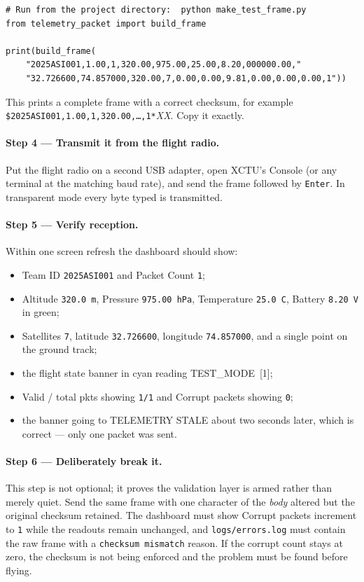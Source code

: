 \documentclass[11pt,a4paper]{article}
\newcommand{\file}[1]{\texttt{#1}}
\newcommand{\code}[1]{\texttt{#1}}
\newcommand{\degC}{\textdegree C}
\begin{document}
\begin{lstlisting}[caption={\file{make\_test\_frame.py} --- generates one valid test frame.}]
# Run from the project directory:  python make_test_frame.py
from telemetry_packet import build_frame

print(build_frame(
    "2025ASI001,1.00,1,320.00,975.00,25.00,8.20,000000.00,"
    "32.726600,74.857000,320.00,7,0.00,0.00,9.81,0.00,0.00,0.00,1"))
\end{lstlisting}

This prints a complete frame with a correct checksum, for example
\code{\$2025ASI001,1.00,1,320.00,\ldots,1*}\textit{XX}. Copy it exactly.

\paragraph{Step 4 --- Transmit it from the flight radio.}
Put the flight radio on a second USB adapter, open XCTU's \textsf{Console}
(or any terminal at the matching baud rate), and send the frame followed by
\code{Enter}. In transparent mode every byte typed is transmitted.

\paragraph{Step 5 --- Verify reception.}
Within one screen refresh the dashboard should show:

\begin{itemize}
  \item Team ID \code{2025ASI001} and Packet Count \code{1};
  \item Altitude \code{320.0\,m}, Pressure \code{975.00\,hPa}, Temperature
        \code{25.0\,\degC}, Battery \code{8.20\,V} in green;
  \item Satellites \code{7}, latitude \code{32.726600}, longitude
        \code{74.857000}, and a single point on the ground track;
  \item the flight state banner in cyan reading \textsf{TEST\_MODE~[1]};
  \item \textsf{Valid / total pkts} showing \code{1/1} and
        \textsf{Corrupt packets} showing \code{0};
  \item the banner going to \textsf{TELEMETRY STALE} about two seconds later,
        which is correct --- only one packet was sent.
\end{itemize}

\paragraph{Step 6 --- Deliberately break it.}
This step is not optional; it proves the validation layer is armed rather
than merely quiet. Send the same frame with one character of the \emph{body}
altered but the original checksum retained. The dashboard must show
\textsf{Corrupt packets} increment to \code{1} while the readouts remain
unchanged, and \file{logs/errors.log} must contain the raw frame with a
\code{checksum mismatch} reason. If the corrupt count stays at zero, the
checksum is not being enforced and the problem must be found before flying.
\end{document}
